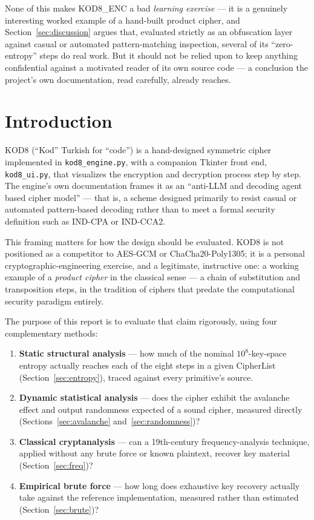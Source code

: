 \documentclass[11pt]{article}
\begin{document}
None of this makes KOD8\_ENC a bad \emph{learning exercise} --- it is a
genuinely interesting worked example of a hand-built product cipher,
and Section~\ref{sec:discussion} argues that, evaluated strictly as an
obfuscation layer against casual or automated pattern-matching
inspection, several of its ``zero-entropy'' steps do real work. But it
should not be relied upon to keep anything confidential against a
motivated reader of its own source code --- a conclusion the project's
own documentation, read carefully, already reaches.

\section{Introduction}

KOD8 (``Kod'' Turkish for ``code'') is a hand-designed symmetric
cipher implemented in \texttt{kod8\_engine.py}, with a companion
Tkinter front end, \texttt{kod8\_ui.py}, that visualizes the encryption
and decryption process step by step. The engine's own documentation
frames it as an ``anti-LLM and decoding agent based cipher model'' ---
that is, a scheme designed primarily to resist casual or automated
pattern-based decoding rather than to meet a formal security definition
such as IND-CPA or IND-CCA2.

This framing matters for how the design should be evaluated. KOD8 is
not positioned as a competitor to AES-GCM or ChaCha20-Poly1305; it is a
personal cryptographic-engineering exercise, and a legitimate,
instructive one: a working example of a \emph{product cipher} in the
classical sense --- a chain of substitution and transposition steps, in
the tradition of ciphers that predate the computational security
paradigm entirely.

The purpose of this report is to evaluate that claim rigorously, using
four complementary methods:

\begin{enumerate}[leftmargin=1.6em]
  \item \textbf{Static structural analysis} --- how much of the nominal
        $10^{8}$-key-space entropy actually reaches each of the eight
        steps in a given CipherList (Section~\ref{sec:entropy}),
        traced against every primitive's source.
  \item \textbf{Dynamic statistical analysis} --- does the cipher exhibit
        the avalanche effect and output randomness expected of a sound
        cipher, measured directly (Sections~\ref{sec:avalanche}
        and~\ref{sec:randomness})?
  \item \textbf{Classical cryptanalysis} --- can a 19th-century
        frequency-analysis technique, applied without any brute force
        or known plaintext, recover key material
        (Section~\ref{sec:freq})?
  \item \textbf{Empirical brute force} --- how long does exhaustive key
        recovery actually take against the reference implementation,
        measured rather than estimated (Section~\ref{sec:brute})?
\end{enumerate}
\end{document}
